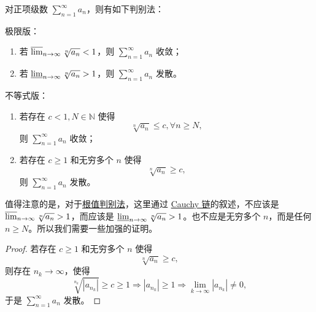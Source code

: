 \documentclass[../../main.tex]{subfiles}%
\begin{document}
\begin{theorem}[根值判别法]\label{theorem:级数-根值判别法}
对正项级数 \(\sum_{n=1}^\infty a_n\)，则有如下判别法：

极限版：
\begin{enumerate}
\item 若 \(\varlimsup_{n \to \infty} \sqrt[n]{a_n} < 1\)，则 \(\sum_{n=1}^\infty a_n\) 收敛；

\item 若 \(\varliminf_{n \to \infty} \sqrt[n]{a_n} > 1\)，则 \(\sum_{n=1}^\infty a_n\) 发散。
\end{enumerate}

不等式版：
\begin{enumerate}
\item 若存在 \( c < 1, N \in \mathbb{N} \) 使得
\[
\sqrt[n]{a_n} \leqslant c, \forall n \geqslant N,
\]
则 \(\sum_{n=1}^\infty a_n\) 收敛；

\item 若存在 \( c \geqslant 1 \) 和无穷多个 \( n \) 使得
\[
\sqrt[n]{a_n} \geqslant c,
\]
则 \(\sum_{n=1}^\infty a_n\) 发散。
\end{enumerate}
\end{theorem}
\begin{remark}
值得注意的是，对于\hyperref[theorem:级数-根值判别法]{根值判别法}，这里通过 \hyperref[theorem:Cauchy链]{Cauchy 链}的叙述，不应该是 \(\varlimsup_{n \to \infty} \sqrt[n]{a_n} > 1\)，而应该是 \(\varliminf_{n \to \infty} \sqrt[n]{a_n} > 1\)。也不应是无穷多个 \( n \)，而是任何 \( n \geqslant N \)。所以我们需要一些加强的证明。
\end{remark}
\begin{proof}

若存在 \( c \geqslant 1 \) 和无穷多个 \( n \) 使得
\[
\sqrt[n]{a_n} \geqslant c,
\]
则存在 \( n_k \to \infty \)，使得
\[
\sqrt[n_k]{|a_{n_k}|} \geqslant c \geqslant 1 \Rightarrow |a_{n_k}| \geqslant 1 \Rightarrow \lim_{k \to \infty} |a_{n_k}| \neq 0,
\]
于是 \(\sum_{n=1}^\infty a_n\) 发散。

\end{proof}
 
\end{document}
